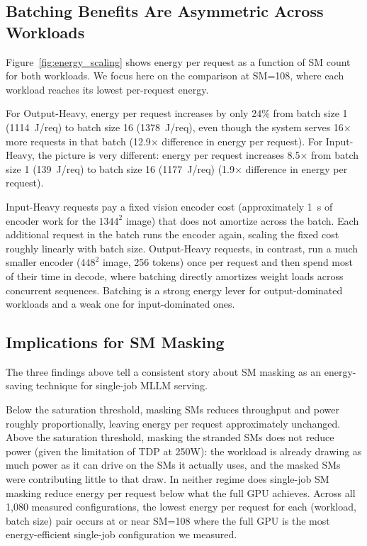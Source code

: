 \documentclass[10pt,twocolumn]{article}
\begin{document}
\subsection{Batching Benefits Are Asymmetric Across Workloads}
\label{sec:eval-energy}

Figure~\ref{fig:energy_scaling} shows energy per request as a function of SM count for both workloads. We focus here on the comparison at SM=108, where each workload reaches its lowest per-request energy.

For Output-Heavy, energy per request increases by only 24\% from batch size 1 (1114~J/req) to batch size 16 (1378~J/req), even though the system serves 16$\times$ more requests in that batch (12.9$\times$ difference in energy per request). For Input-Heavy, the picture is very different: energy per request increases 8.5$\times$ from batch size 1 (139~J/req) to batch size 16 (1177~J/req) (1.9$\times$ difference in energy per request).

Input-Heavy requests pay a fixed vision encoder cost (approximately 1~s of encoder work for the $1344^2$ image) that does not amortize across the batch. Each additional request in the batch runs the encoder again, scaling the fixed cost roughly linearly with batch size. Output-Heavy requests, in contrast, run a much smaller encoder ($448^2$ image, 256 tokens) once per request and then spend most of their time in decode, where batching directly amortizes weight loads across concurrent sequences. Batching is a strong energy lever for output-dominated workloads and a weak one for input-dominated ones.

\subsection{Implications for SM Masking}
\label{sec:eval-implications}

The three findings above tell a consistent story about SM masking as an energy-saving technique for single-job MLLM serving.

Below the saturation threshold, masking SMs reduces throughput and power roughly proportionally, leaving energy per request approximately unchanged. Above the saturation threshold, masking the stranded SMs does not reduce power (given the limitation of TDP at 250W): the workload is already drawing as much power as it can drive on the SMs it actually uses, and the masked SMs were contributing little to that draw. In neither regime does single-job SM masking reduce energy per request below what the full GPU achieves. Across all 1{,}080 measured configurations, the lowest energy per request for each (workload, batch size) pair occurs at or near SM=108 where the full GPU is the most energy-efficient single-job configuration we measured.
\end{document}
